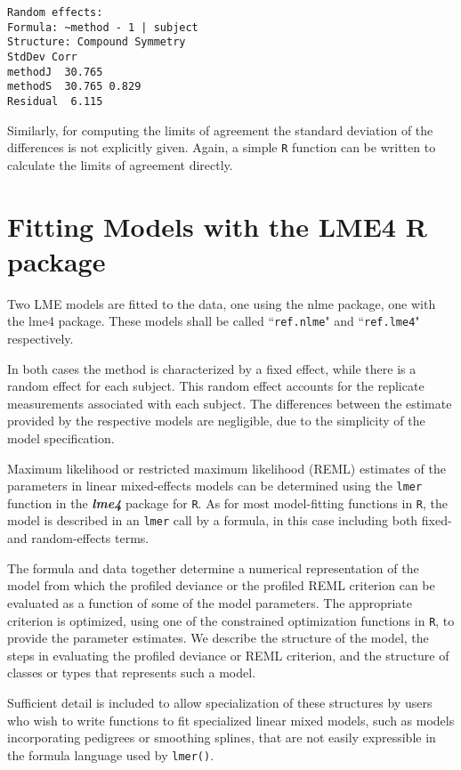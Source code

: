 \documentclass[12pt, a4paper]{report}
\theoremstyle{plain}
\theoremstyle{definition}
\theoremstyle{remark}
\begin{document}
\begin{framed}
\begin{verbatim}
Random effects:
Formula: ~method - 1 | subject
Structure: Compound Symmetry
StdDev Corr
methodJ  30.765
methodS  30.765 0.829
Residual  6.115
\end{verbatim}
\end{framed}

Similarly, for computing the limits of agreement the standard deviation of the differences is not explicitly given. Again, a simple \texttt{R} function can be written to calculate the limits of agreement directly.


\section{Fitting Models with the LME4 R package}
Two LME models are fitted to the data, one using the nlme package, one with the lme4 package. These models shall be called ``\texttt{ref.nlme}" and ``\texttt{ref.lme4}" respectively.

In both cases the method is characterized by a fixed effect, while there is a random effect for each subject. This random effect accounts for the replicate measurements associated with each subject. The differences between the estimate provided by the respective models are negligible, due to the simplicity of the model specification.

Maximum likelihood or restricted maximum likelihood (REML) estimates of the parameters in linear mixed-effects models can be determined using the \texttt{lmer} function in the \textbf{\textit{lme4}} package for \texttt{R}. As for most model-fitting functions in \texttt{R}, the model is described in an \texttt{lmer} call by a formula, in this case including both fixed- and random-effects terms. 

The formula and data together determine a numerical representation of the model from which the profiled deviance or the profiled REML criterion can be evaluated as a function of some of the model parameters. The appropriate criterion is optimized, using one of the constrained optimization functions in \texttt{R}, to provide the parameter estimates. We describe the structure of the model, the steps in evaluating the profiled deviance or REML criterion, and the structure of classes or types that represents such a model. 

Sufficient detail is included to allow specialization of these structures by users who wish to write functions to fit specialized linear mixed models, such as models incorporating pedigrees or smoothing splines, that are not easily expressible in the formula language used by \texttt{lmer()}.





\end{document}
